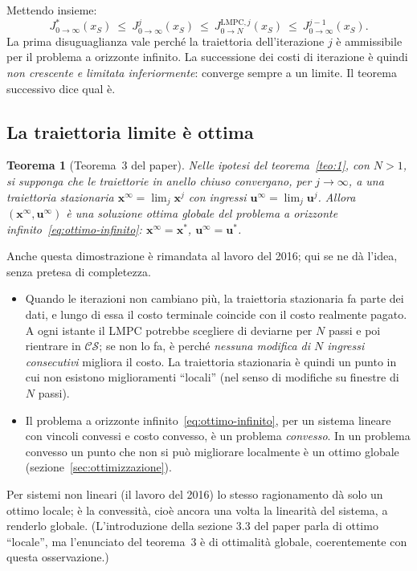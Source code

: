 \documentclass[11pt,a4paper]{article}
\theoremstyle{definition}
\theoremstyle{plain}
\newtheorem{teorema}[definizione]{Teorema}
\theoremstyle{remark}
\newcommand{\CS}{\mathcal{CS}}
\newcommand{\JL}{J^{\mathrm{LMPC},j}_{0\to N}}
\newcommand{\Jstar}{J^{*}_{0\to\infty}}
\newcommand{\vett}[1]{\mathbf{#1}}
\begin{document}
\medskip
\noindent
Mettendo insieme:
\begin{equation}\label{eq:catena}
  \Jstar(x_S)\ \le\ J^j_{0\to\infty}(x_S)\ \le\ \JL(x_S)\ \le\ J^{j-1}_{0\to\infty}(x_S).
\end{equation}
La prima disuguaglianza vale perché la traiettoria dell'iterazione $j$ è
ammissibile per il problema a orizzonte infinito. La successione dei costi di
iterazione è quindi \emph{non crescente e limitata inferiormente}: converge
sempre a un limite. Il teorema successivo dice qual è.

\subsection{La traiettoria limite è ottima}

\begin{teorema}[Teorema~3 del paper]\label{teo:3}
Nelle ipotesi del teorema~\ref{teo:1}, con $N>1$, si supponga che le
traiettorie in anello chiuso convergano, per $j\to\infty$, a una traiettoria
stazionaria $\vett{x}^\infty=\lim_j\vett{x}^j$ con ingressi
$\vett{u}^\infty=\lim_j\vett{u}^j$. Allora $(\vett{x}^\infty,\vett{u}^\infty)$
è una soluzione ottima globale del problema a orizzonte
infinito~\eqref{eq:ottimo-infinito}: $\vett{x}^\infty=\vett{x}^*$,
$\vett{u}^\infty=\vett{u}^*$.
\end{teorema}

Anche questa dimostrazione è rimandata al lavoro del 2016; qui se ne dà
l'idea, senza pretesa di completezza.
\begin{itemize}
  \item Quando le iterazioni non cambiano più, la traiettoria stazionaria fa
        parte dei dati, e lungo di essa il costo terminale coincide con il
        costo realmente pagato. A ogni istante il LMPC potrebbe scegliere di
        deviarne per $N$ passi e poi rientrare in $\CS$; se non lo fa, è perché
        \emph{nessuna modifica di $N$ ingressi consecutivi} migliora il costo.
        La traiettoria stazionaria è quindi un punto in cui non esistono
        miglioramenti ``locali'' (nel senso di modifiche su finestre di $N$
        passi).
  \item Il problema a orizzonte infinito~\eqref{eq:ottimo-infinito}, per un
        sistema lineare con vincoli convessi e costo convesso, è un problema
        \emph{convesso}. In un problema convesso un punto che non si può
        migliorare localmente è un ottimo globale
        (sezione~\ref{sec:ottimizzazione}).
\end{itemize}
Per sistemi non lineari (il lavoro del 2016) lo stesso ragionamento dà solo
un ottimo locale; è la convessità, cioè ancora una volta la linearità del
sistema, a renderlo globale. (L'introduzione della sezione 3.3 del paper parla
di ottimo ``locale'', ma l'enunciato del teorema~3 è di ottimalità globale,
coerentemente con questa osservazione.)
\end{document}

